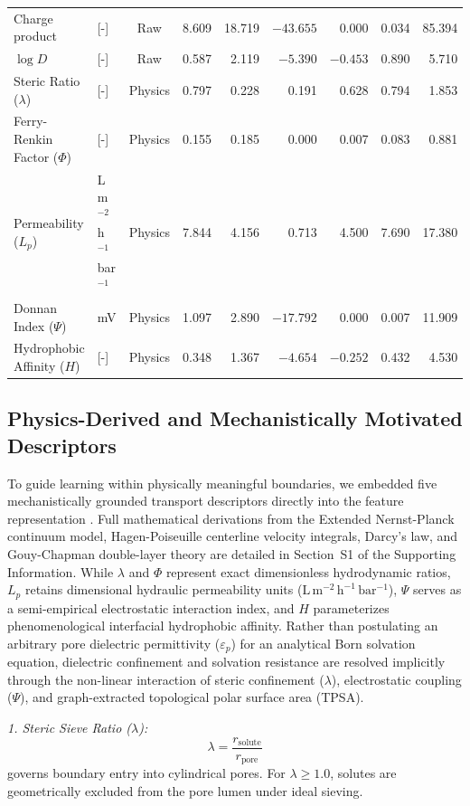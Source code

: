 \documentclass[11pt]{article}
\begin{document}
\begin{table}[htbp]
{\begin{tabular}{llcrrrrrr}
Charge product & [-] & Raw & 8.609 & 18.719 & $-43.655$ & 0.000 & 0.034 & 85.394 \\
$\log D$ & [-] & Raw & 0.587 & 2.119 & $-5.390$ & $-0.453$ & 0.890 & 5.710 \\
Steric Ratio ($\lambda$) & [-] & Physics & 0.797 & 0.228 & 0.191 & 0.628 & 0.794 & 1.853 \\
Ferry-Renkin Factor ($\Phi$) & [-] & Physics & 0.155 & 0.185 & 0.000 & 0.007 & 0.083 & 0.881 \\
Permeability ($L_p$) & L m$^{-2}$h$^{-1}$bar$^{-1}$ & Physics & 7.844 & 4.156 & 0.713 & 4.500 & 7.690 & 17.380 \\
Donnan Index ($\Psi$) & mV & Physics & 1.097 & 2.890 & $-17.792$ & 0.000 & 0.007 & 11.909 \\
Hydrophobic Affinity ($H$) & [-] & Physics & 0.348 & 1.367 & $-4.654$ & $-0.252$ & 0.432 & 4.530 \\
\bottomrule
\end{tabular}%
}
\end{table}

\subsection{Physics-Derived and Mechanistically Motivated Descriptors}
\label{subsec:physics}

To guide learning within physically meaningful boundaries, we embedded five mechanistically grounded transport descriptors directly into the feature representation \cite{yangaliquintanilla2009,renkin1954,bowen2002}. Full mathematical derivations from the Extended Nernst-Planck continuum model, Hagen-Poiseuille centerline velocity integrals, Darcy's law, and Gouy-Chapman double-layer theory are detailed in Section~S1 of the Supporting Information. While $\lambda$ and $\Phi$ represent exact dimensionless hydrodynamic ratios, $L_p$ retains dimensional hydraulic permeability units ($\mathrm{L\,m^{-2}\,h^{-1}\,bar^{-1}}$), $\Psi$ serves as a semi-empirical electrostatic interaction index, and $H$ parameterizes phenomenological interfacial hydrophobic affinity. Rather than postulating an arbitrary pore dielectric permittivity ($\varepsilon_p$) for an analytical Born solvation equation, dielectric confinement and solvation resistance are resolved implicitly through the non-linear interaction of steric confinement ($\lambda$), electrostatic coupling ($\Psi$), and graph-extracted topological polar surface area (TPSA).

\textit{1. Steric Sieve Ratio ($\lambda$):}
\begin{equation}
\lambda = \frac{r_{\mathrm{solute}}}{r_{\mathrm{pore}}}
\label{eq:lambda}
\end{equation}
governs boundary entry into cylindrical pores. For $\lambda \geq 1.0$, solutes are geometrically excluded from the pore lumen under ideal sieving.
\end{document}
